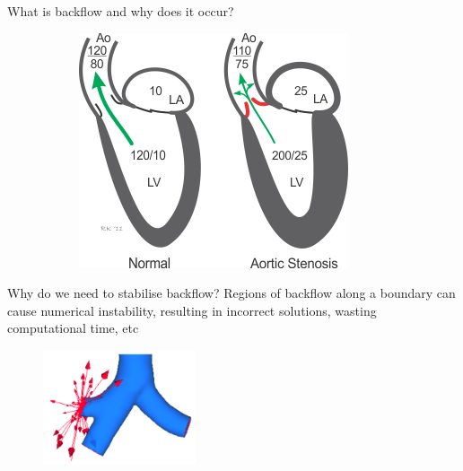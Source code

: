 \begin{frame}{What is backflow and why does it occur?}
\begin{figure}[h]
\begin{subfigure}[b]{0.3\textwidth}
     \end{subfigure}
      \hfill
     \begin{subfigure}[b]{0.3\textwidth}
         \centering
         \includegraphics[width=\textwidth]{Media/Stenosis3.png}
     \end{subfigure}
\end{figure}

\end{frame}
\begin{frame}{Why do we need to stabilise backflow?}
  Regions of backflow along a boundary can cause numerical instability, resulting in incorrect solutions, wasting computational time, etc
  \begin{figure}[b]
      \centering
      \includegraphics[width=0.4\textwidth]{Media/instability.PNG}
  \end{figure}
\end{frame}
